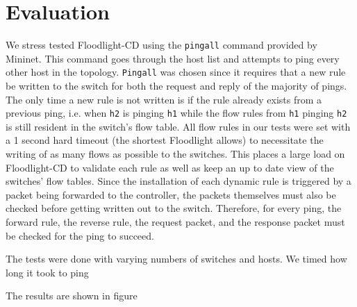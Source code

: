 \section{Evaluation}
\label{sec:evaluation}

We stress tested Floodlight-CD using the \texttt{pingall} command provided by Mininet.
This command goes through the host list and attempts to ping every other host in the topology.
\texttt{Pingall} was chosen since it requires that a new rule be written to the switch for both the request and reply of the majority of pings.
The only time a new rule is not written is if the rule already exists from a previous ping, i.e. when \texttt{h2} is pinging \texttt{h1} while the flow rules from \texttt{h1} pinging \texttt{h2} is still resident in the switch's flow table.
All flow rules in our tests were set with a 1 second hard timeout (the shortest Floodlight allows) to necessitate the writing of as many flows as possible to the switches.
This places a large load on Floodlight-CD to validate each rule as well as keep an up to date view of the switches' flow tables.
Since the installation of each dynamic rule is triggered by a packet being forwarded to the controller, the packets themselves must also be checked before getting written out to the switch.
Therefore, for every ping, the forward rule, the reverse rule, the request packet, and the response packet must be checked for the ping to succeed.

The tests were done with varying numbers of switches and hosts.
We timed how long it took to ping 
 
The results are shown in figure %

